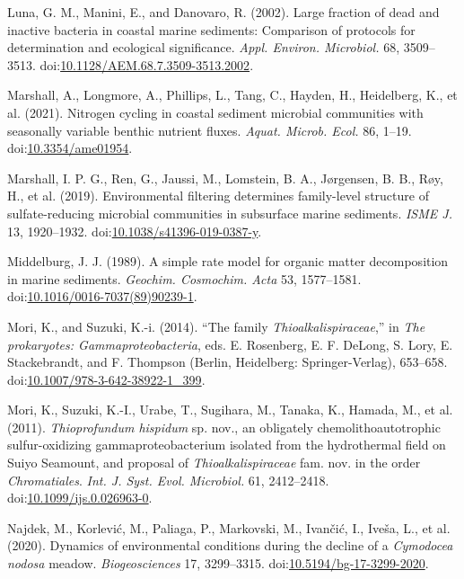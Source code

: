 \documentclass[12pt,]{article}
\begin{document}
\leavevmode\hypertarget{ref-Luna2002}{}%
Luna, G. M., Manini, E., and Danovaro, R. (2002). Large fraction of dead
and inactive bacteria in coastal marine sediments: Comparison of
protocols for determination and ecological significance. \emph{Appl.
Environ. Microbiol.} 68, 3509--3513.
doi:\href{https://doi.org/10.1128/AEM.68.7.3509-3513.2002}{10.1128/AEM.68.7.3509-3513.2002}.

\leavevmode\hypertarget{ref-Marshall2021}{}%
Marshall, A., Longmore, A., Phillips, L., Tang, C., Hayden, H.,
Heidelberg, K., et al. (2021). Nitrogen cycling in coastal sediment
microbial communities with seasonally variable benthic nutrient fluxes.
\emph{Aquat. Microb. Ecol.} 86, 1--19.
doi:\href{https://doi.org/10.3354/ame01954}{10.3354/ame01954}.

\leavevmode\hypertarget{ref-Marshall2019}{}%
Marshall, I. P. G., Ren, G., Jaussi, M., Lomstein, B. A., Jørgensen, B.
B., Røy, H., et al. (2019). Environmental filtering determines
family-level structure of sulfate-reducing microbial communities in
subsurface marine sediments. \emph{ISME J.} 13, 1920--1932.
doi:\href{https://doi.org/10.1038/s41396-019-0387-y}{10.1038/s41396-019-0387-y}.

\leavevmode\hypertarget{ref-Middelburg1989}{}%
Middelburg, J. J. (1989). A simple rate model for organic matter
decomposition in marine sediments. \emph{Geochim. Cosmochim. Acta} 53,
1577--1581.
doi:\href{https://doi.org/10.1016/0016-7037(89)90239-1}{10.1016/0016-7037(89)90239-1}.

\leavevmode\hypertarget{ref-Mori2014}{}%
Mori, K., and Suzuki, K.-i. (2014). ``The family
\emph{Thioalkalispiraceae},'' in \emph{The prokaryotes:
Gammaproteobacteria}, eds. E. Rosenberg, E. F. DeLong, S. Lory, E.
Stackebrandt, and F. Thompson (Berlin, Heidelberg: Springer-Verlag),
653--658.
doi:\href{https://doi.org/10.1007/978-3-642-38922-1_399}{10.1007/978-3-642-38922-1\_399}.

\leavevmode\hypertarget{ref-Mori2011}{}%
Mori, K., Suzuki, K.-I., Urabe, T., Sugihara, M., Tanaka, K., Hamada,
M., et al. (2011). \emph{Thioprofundum hispidum} sp. nov., an obligately
chemolithoautotrophic sulfur-oxidizing gammaproteobacterium isolated
from the hydrothermal field on Suiyo Seamount, and proposal of
\emph{Thioalkalispiraceae} fam. nov. in the order \emph{Chromatiales}.
\emph{Int. J. Syst. Evol. Microbiol.} 61, 2412--2418.
doi:\href{https://doi.org/10.1099/ijs.0.026963-0}{10.1099/ijs.0.026963-0}.

\leavevmode\hypertarget{ref-Najdek2020}{}%
Najdek, M., Korlević, M., Paliaga, P., Markovski, M., Ivančić, I.,
Iveša, L., et al. (2020). Dynamics of environmental conditions during
the decline of a \emph{Cymodocea} \emph{nodosa} meadow.
\emph{Biogeosciences} 17, 3299--3315.
doi:\href{https://doi.org/10.5194/bg-17-3299-2020}{10.5194/bg-17-3299-2020}.
\end{document}
